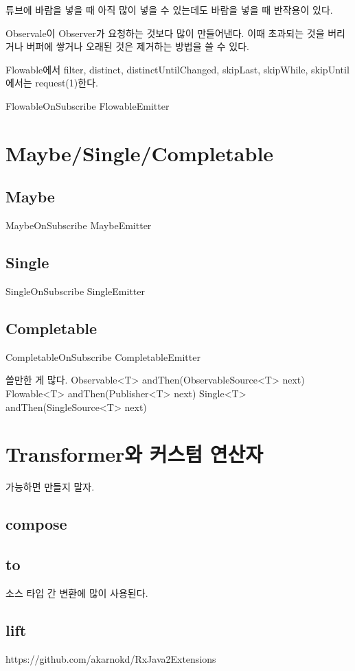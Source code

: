 \documentclass{book}
\begin{document}
{튜브에 바람을 넣을 때 아직 많이 넣을 수 있는데도 바람을 넣을 때 반작용이 있다.

Observale이 Observer가 요청하는 것보다 많이 만들어낸다.
이때 초과되는 것을 버리거나 버퍼에 쌓거나 오래된 것은 제거하는 방법을 쓸 수 있다.

Flowable에서 filter, distinct, distinctUntilChanged, skipLast, skipWhile, skipUntil 에서는 request(1)한다.

FlowableOnSubscribe
FlowableEmitter

\chapter{Maybe/Single/Completable}

\section{Maybe}
MaybeOnSubscribe
MaybeEmitter
\section{Single}
SingleOnSubscribe
SingleEmitter

\section{Completable}
CompletableOnSubscribe
CompletableEmitter

쓸만한 게 많다.
Observable<T> andThen(ObservableSource<T> next)
Flowable<T> andThen(Publisher<T> next)
Single<T> andThen(SingleSource<T> next)
 

\chapter{Transformer와 커스텀 연산자}
가능하면 만들지 말자.
\section{compose}
\section{to}
소스 타입 간 변환에 많이 사용된다.

\section{lift}

https://github.com/akarnokd/RxJava2Extensions

}
\end{document}

